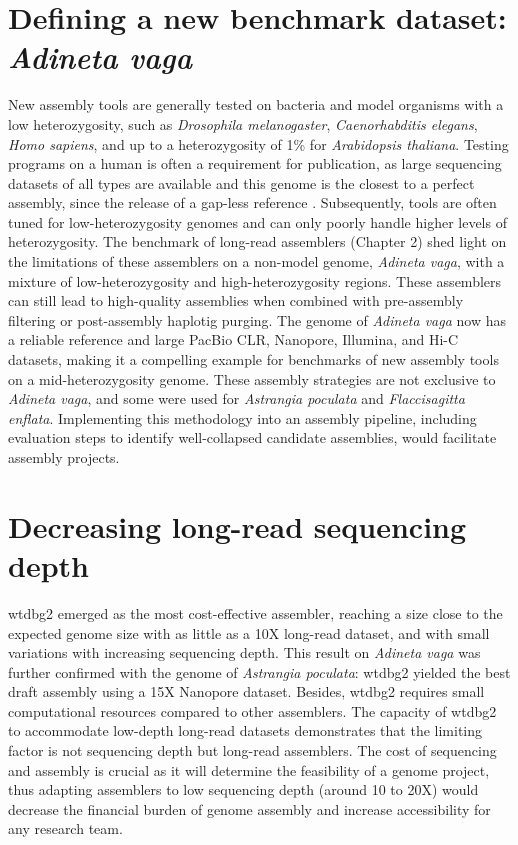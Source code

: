 \section{Defining a new benchmark dataset: \textit{Adineta vaga}}

New assembly tools are generally tested on bacteria and model organisms with a low heterozygosity, such as \textit{Drosophila melanogaster}, \textit{Caenorhabditis elegans}, \textit{Homo sapiens}, and up to a heterozygosity of 1\% for \textit{Arabidopsis thaliana}. Testing programs on a human is often a requirement for publication, as large sequencing datasets of all types are available and this genome is the closest to a perfect assembly, since the release of a gap-less reference \cite{complete_human}. Subsequently, tools are often tuned for low-heterozygosity genomes and can only poorly handle higher levels of heterozygosity. The benchmark of long-read assemblers (Chapter 2) shed light on the limitations of these assemblers on a non-model genome, \textit{Adineta vaga}, with a mixture of low-heterozygosity and high-heterozygosity regions. These assemblers can still lead to high-quality assemblies when combined with pre-assembly filtering or post-assembly haplotig purging. The genome of \textit{Adineta vaga} now has a reliable reference and large PacBio CLR, Nanopore, Illumina, and Hi-C datasets, making it a compelling example for benchmarks of new assembly tools on a mid-heterozygosity genome. These assembly strategies are not exclusive to \textit{Adineta vaga}, and some were used for \textit{Astrangia poculata} and \textit{Flaccisagitta enflata}. Implementing this methodology into an assembly pipeline, including evaluation steps to identify well-collapsed candidate assemblies, would facilitate assembly projects. \\

\section{Decreasing long-read sequencing depth}

wtdbg2 emerged as the most cost-effective assembler, reaching a size close to the expected genome size with as little as a 10X long-read dataset, and with small variations with increasing sequencing depth. This result on \textit{Adineta vaga} was further confirmed with the genome of \textit{Astrangia poculata}: wtdbg2 yielded the best draft assembly using a 15X Nanopore dataset. Besides, wtdbg2 requires small computational resources compared to other assemblers. The capacity of wtdbg2 to accommodate low-depth long-read datasets demonstrates that the limiting factor is not sequencing depth but long-read assemblers. The cost of sequencing and assembly is crucial as it will determine the feasibility of a genome project, thus adapting assemblers to low sequencing depth (around 10 to 20X) would decrease the financial burden of genome assembly and increase accessibility for any research team. \\

